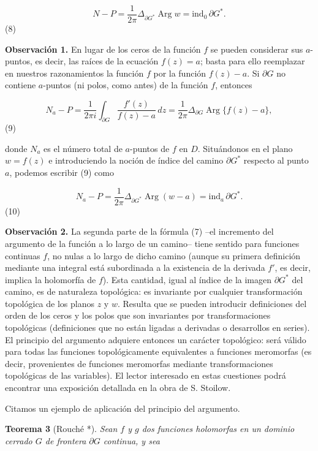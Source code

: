 \documentclass{article}
\begin{document}
\[N - P = \frac{1}{2\pi} \Delta_{\partial G^*} \operatorname{Arg} w = \text{ind}_0\, \partial G^*.\] 
(8)

\textbf{Observación 1.} En lugar de los ceros de la función \(f\) se pueden considerar sus \(a\)-puntos, es decir, las raíces de la ecuación \(f(z) = a\); basta para ello reemplazar en nuestros razonamientos la función \(f\) por la función \(f(z) - a\). Si \(\partial G\) no contiene \(a\)-puntos (ni polos, como antes) de la función \(f\), entonces

\[N_a - P = \frac{1}{2\pi i} \int_{\partial G} \frac{f'(z)}{f(z) - a}\, dz = \frac{1}{2\pi} \Delta_{\partial G} \operatorname{Arg} \{f(z) - a\},\] 
(9)

donde \(N_a\) es el número total de \(a\)-puntos de \(f\) en \(D\). Situándonos en el plano \(w = f(z)\) e introduciendo la noción de índice del camino \(\partial G^*\) respecto al punto \(a\), podemos escribir (9) como

\[N_a - P = \frac{1}{2\pi} \Delta_{\partial G^*} \operatorname{Arg} (w - a) = \text{ind}_a\, \partial G^*.\] 
(10)

\textbf{Observación 2.} La segunda parte de la fórmula (7) --el incremento del argumento de la función a lo largo de un camino-- tiene sentido para funciones continuas \(f\), no nulas a lo largo de dicho camino (aunque su primera definición mediante una integral está subordinada a la existencia de la derivada \(f'\), es decir, implica la holomorfía de \(f\)). Esta cantidad, igual al índice de la imagen \(\partial G^*\) del camino, es de naturaleza topológica: es invariante por cualquier transformación topológica de los planos \(z\) y \(w\). Resulta que se pueden introducir definiciones del orden de los ceros y los polos que son invariantes por transformaciones topológicas (definiciones que no están ligadas a derivadas o desarrollos en series). El principio del argumento adquiere entonces un carácter topológico: será válido para todas las funciones topológicamente equivalentes a funciones meromorfas (es decir, provenientes de funciones meromorfas mediante transformaciones topológicas de las variables). El lector interesado en estas cuestiones podrá encontrar una exposición detallada en la obra de S. Stoilow.

Citamos un ejemplo de aplicación del principio del argumento.

\textbf{Teorema 3} (Rouché *). \textit{Sean \( f \) y \( g \) dos funciones holomorfas en un dominio cerrado \( G \) de frontera \( \partial G \) continua, y sea}
\end{document}
